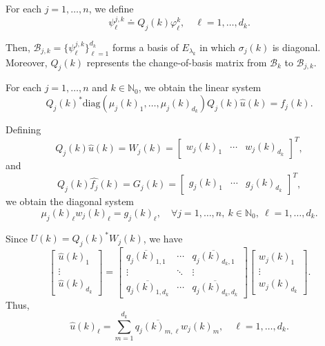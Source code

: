 \documentclass{amsart}
\theoremstyle{definition}
\theoremstyle{remark}
\numberwithin{equation}{section}
\begin{document}
	For each $j=1,\dots,n$, we define  
	\begin{equation}\label{psi}
		\psi_{\ell}^{j,k} \doteq Q_j(k)\varphi_{\ell}^{k},\quad \ell=1,\dots,d_k.
	\end{equation}  
	
	Then, $\mathcal{B}_{j,k} = \{\psi_\ell^{j,k}\}_{\ell=1}^{d_k}$ forms a basis of $E_{\lambda_k}$ in which $\sigma_j(k)$ is diagonal. Moreover, $Q_j(k)$ represents the change-of-basis matrix from $\mathcal{B}_{k}$ to $\mathcal{B}_{j,k}$.  
	
	For each $j=1,\dots,n$ and $k\in\mathbb{N}_0$, we obtain the linear system  
	\begin{equation*}
		Q_j(k)^* \text{diag}(\mu_j(k)_1,\dots,\mu_j(k)_{d_k}) Q_j(k) \widehat{u}(k) = \widehat{f_j}(k).
	\end{equation*}
	
	Defining  
	\begin{equation}\label{QUW}
		Q_j(k)\widehat{u}(k) = W_j(k) =  
		\begin{bmatrix}
			w_j(k)_1& \cdots& w_j(k)_{d_k}
		\end{bmatrix}^T,
	\end{equation}
	and  
	\begin{equation}\label{QGF}
		Q_j(k)\widehat{f_j}(k) = G_j(k) =  
		\begin{bmatrix}
			g_j(k)_1& \cdots& g_j(k)_{d_k}
		\end{bmatrix}^T,
	\end{equation}
	we obtain the diagonal system  
	\begin{equation}\label{muwg}
		\mu_j(k)_\ell w_j(k)_\ell = g_j(k)_\ell,\quad \forall j=1,\dots,n,\ k\in\mathbb{N}_0,\ \ell=1,\dots,d_k.
	\end{equation}
	
	Since $U(k) = Q_j(k)^* W_j(k)$, we have  
	\begin{equation*}
		\begin{bmatrix}
			\widehat{u}(k)_1\\ \vdots \\ \widehat{u}(k)_{d_k}
		\end{bmatrix} =  
		\begin{bmatrix}
			\overline{q_j(k)_{1,1}} & \cdots& \overline{q_j(k)_{d_k,1}}\\
			\vdots&\ddots&\vdots\\
			\overline{q_j(k)_{1,d_k}} & \cdots & \overline{q_j(k)_{d_k,d_k}}
		\end{bmatrix}  
		\begin{bmatrix}
			w_j(k)_1\\ \vdots \\ w_j(k)_{d_k}
		\end{bmatrix}.
	\end{equation*}
	Thus,  
	\begin{equation}\label{uqw}
		\widehat{u}(k)_\ell = \sum_{m=1}^{d_k} \overline{q_j(k)_{m,\ell}} w_j(k)_{m},\quad\ell=1,\dots,d_k.
	\end{equation}
	
\end{document}
